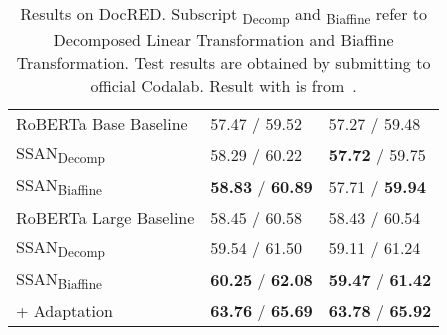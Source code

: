 \documentclass[letterpaper]{article} \usepackage{aaai21}  \usepackage{times}  \usepackage{helvet} \usepackage{courier}  \usepackage[hyphens]{url}  \usepackage{graphicx} \usepackage{booktabs}
\begin{document}
\begin{table}[t!]
\begin{tabular*}{0.48\textwidth}{@{}L{3.7cm}C{20mm}C{20mm}@{}}
RoBERTa Base Baseline&57.47 / 59.52&57.27 / 59.48\\
SSAN\textsubscript{Decomp}&58.29 / 60.22&\textbf{57.72} / 59.75\\
SSAN\textsubscript{Biaffine}&\textbf{58.83} / \textbf{60.89}&57.71 / \textbf{59.94}\\
\midrule
RoBERTa Large Baseline&58.45 / 60.58&58.43 / 60.54\\
SSAN\textsubscript{Decomp}&59.54 / 61.50&59.11 / 61.24\\
SSAN\textsubscript{Biaffine}&\textbf{60.25} / \textbf{62.08}&\textbf{59.47} / \textbf{61.42}\\
\midrule
\quad+ Adaptation&\textbf{63.76} / \textbf{65.69}&\textbf{63.78} / \textbf{65.92}\\
\bottomrule
\end{tabular*}
\caption{Results on DocRED. Subscript \textsubscript{Decomp} and \textsubscript{Biaffine} refer to Decomposed Linear Transformation and Biaffine Transformation. Test results are obtained by submitting to official Codalab.
Result with  is from~\citet{nan-etal-2020-reasoning}.}
\label{DocRED}
\end{table}
\end{document}
